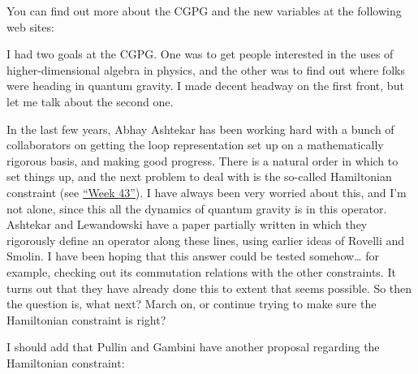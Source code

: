 \documentclass{article}
\def\tightlist{}
\renewcommand{\texttt}[1]{%
  \begingroup
  \ttfamily
  \begingroup\lccode`~=`/\lowercase{\endgroup\def~}{/\discretionary{}{}{}}%
  \begingroup\lccode`~=`[\lowercase{\endgroup\def~}{[\discretionary{}{}{}}%
  \begingroup\lccode`~=`.\lowercase{\endgroup\def~}{.\discretionary{}{}{}}%
  \catcode`/=\active\catcode`[=\active\catcode`.=\active
  \scantokens{#1\noexpand}%
  \endgroup
}
\begin{document}
You can find out more about the CGPG and the new variables at the
following web sites:


I had two goals at the CGPG. One was to get people interested in the
uses of higher-dimensional algebra in physics, and the other was to find
out where folks were heading in quantum gravity. I made decent headway
on the first front, but let me talk about the second one.

In the last few years, Abhay Ashtekar has been working hard with a bunch
of collaborators on getting the loop representation set up on a
mathematically rigorous basis, and making good progress. There is a
natural order in which to set things up, and the next problem to deal
with is the so-called Hamiltonian constraint (see
\protect\hyperlink{week43}{``Week 43''}). I have always been very
worried about this, and I'm not alone, since this all the dynamics of
quantum gravity is in this operator. Ashtekar and Lewandowski have a
paper partially written in which they rigorously define an operator
along these lines, using earlier ideas of Rovelli and Smolin. I have
been hoping that this answer could be tested somehow\ldots{} for
example, checking out its commutation relations with the other
constraints. It turns out that they have already done this to extent
that seems possible. So then the question is, what next? March on, or
continue trying to make sure the Hamiltonian constraint is right?

I should add that Pullin and Gambini have another proposal regarding the
Hamiltonian constraint:

\end{document}
